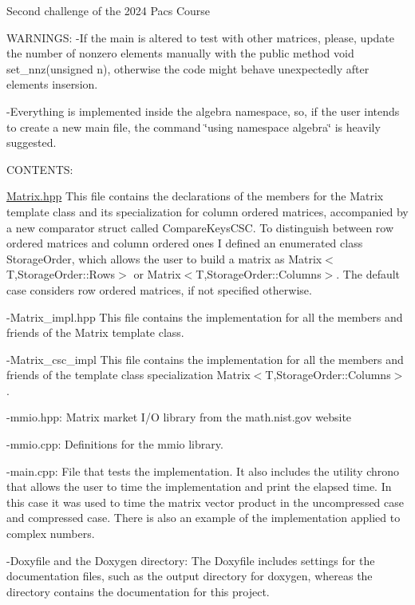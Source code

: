 Second challenge of the 2024 Pacs Course

WARNINGS\+: -\/If the main is altered to test with other matrices, please, update the number of nonzero elements manually with the public method void set\+\_\+nnz(unsigned n), otherwise the code might behave unexpectedly after elements insersion.

-\/Everything is implemented inside the algebra namespace, so, if the user intends to create a new main file, the command \char`\"{}using namespace algebra\char`\"{} is heavily suggested.

CONTENTS\+:


\begin{DoxyItemize}
\item \mbox{\hyperlink{Matrix_8hpp}{Matrix.\+hpp}} This file contains the declarations of the members for the Matrix template class and its specialization for column ordered matrices, accompanied by a new comparator struct called Compare\+Keys\+CSC. To distinguish between row ordered matrices and column ordered ones I defined an enumerated class Storage\+Order, which allows the user to build a matrix as Matrix$<$\+T,\+Storage\+Order\+::\+Rows$>$ or Matrix$<$\+T,\+Storage\+Order\+::\+Columns$>$. The default case considers row ordered matrices, if not specified otherwise.
\end{DoxyItemize}

-\/\+Matrix\+\_\+impl.\+hpp This file contains the implementation for all the members and friends of the Matrix template class.

-\/Matrix\+\_\+csc\+\_\+impl This file contains the implementation for all the members and friends of the template class specialization Matrix$<$\+T,\+Storage\+Order\+::\+Columns$>$.

-\/mmio.\+hpp\+: Matrix market I/O library from the math.\+nist.\+gov website

-\/mmio.\+cpp\+: Definitions for the mmio library.

-\/main.\+cpp\+: File that tests the implementation. It also includes the utility chrono that allows the user to time the implementation and print the elapsed time. In this case it was used to time the matrix vector product in the uncompressed case and compressed case. There is also an example of the implementation applied to complex numbers.

-\/Doxyfile and the Doxygen directory\+: The Doxyfile includes settings for the documentation files, such as the output directory for doxygen, whereas the directory contains the documentation for this project. 